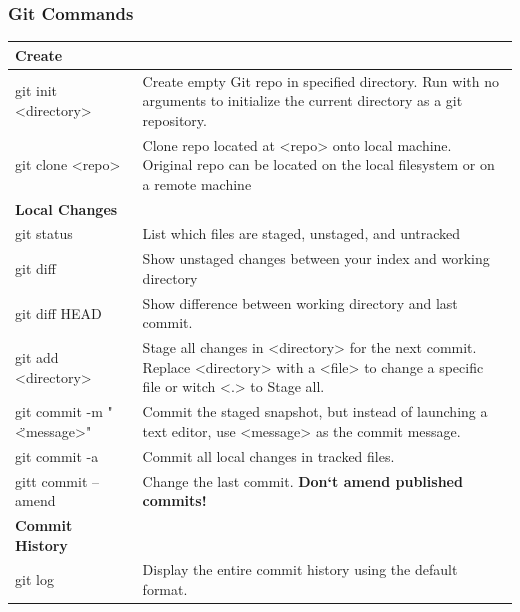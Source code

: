 \subsubsection{Git Commands}
\begin{longtable}{| p{} | p{} |}
	\hline 
	\textbf{Create}&
	\\ \hline
	
	git init <directory>&
	Create empty Git repo in specified directory.\newline
	Run with no arguments to initialize the current directory as a git repository.
	\\ \hline 
	
	git clone <repo>& 
	Clone repo located at <repo> onto local machine.\newline
	Original repo can be located on the local filesystem or on a remote machine
	\\ \hline  \hline
	
	\textbf{Local Changes}&
	\\ \hline 
	
	\hline 
	git status&
	List which files are staged, unstaged, and untracked  
	\\ \hline
	
	git diff& 
	Show unstaged changes between your index and working
	directory 
	\\ \hline 
	
	git diff HEAD&
	Show difference between working directory and last commit.
	\\ \hline
	
	git add <directory>&
	Stage all changes in <directory> for the next commit. Replace <directory>
	with a <file> to change a specific file or witch <.> to Stage all.
	\\ \hline 
	
	git commit -m " \" <message>"&
	Commit the staged snapshot, but instead of launching a text editor, use
	<message> as the commit message.
	\\ \hline
	
	git commit -a&
	Commit all local changes in tracked files.  
	\\ \hline 
	
	gitt commit --amend&
	Change the last commit. \textbf{Don‘t amend published commits!}
	\\ \hline \hline
	
	\textbf{Commit History}&  
	\\ \hline 
	
	\hline
	git log&
	Display the entire commit history using the default format.
	\\ \hline 
	

\end{longtable}
